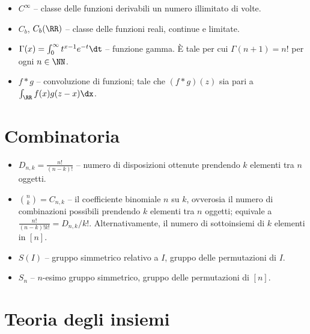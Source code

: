 \begin{multicols*}{2}
\begin{itemize}
        \item $C^\infty$ -- classe delle funzioni derivabili un numero illimitato di volte.
        \item $C_b$, $C_b(\RR)$ -- classe delle funzioni reali, continue e limitate.
        \item $\Gamma(x) = \int_0^\infty t^{x-1} e^{-t} \dt$ -- funzione gamma. È tale per cui $\Gamma(n+1) = n!$ per ogni $n \in \NN$.
        \item $f * g$ -- convoluzione di funzioni; tale che $(f * g)(z)$ sia pari a $\int_\RR f(x) g(z-x) \dx$.
    \end{itemize}

    \section*{Combinatoria}

    \begin{itemize}
        \item $D_{n,k} = \frac{n!}{(n-k)!}$ -- numero di disposizioni ottenute prendendo
        $k$ elementi tra $n$ oggetti.
        \item $\binom{n}{k} = C_{n,k}$ -- il coefficiente binomiale $n$ su $k$,
        ovverosia il numero di combinazioni possibili prendendo $k$ elementi tra $n$ oggetti; equivale a $\frac{n!}{(n-k)!k!} = D_{n,k}/k!$. Alternativamente,
        il numero di sottoinsiemi di $k$ elementi in $[n]$.
        \item $S(I)$ -- gruppo simmetrico relativo a $I$, gruppo delle permutazioni
        di $I$.
        \item $S_n$ -- $n$-esimo gruppo simmetrico, gruppo delle permutazioni
        di $[n]$.
    \end{itemize}

    \section*{Teoria degli insiemi}


\end{multicols*}
